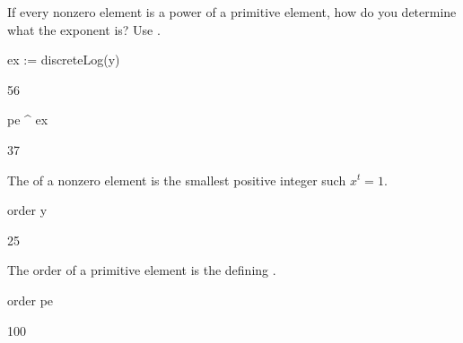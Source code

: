 {{{{{{{{{{{{{{{{\begin{xtc}
\begin{TeXOutput}
\begin{fricasmath}{15}
{%
%
}%
\end{fricasmath}
\end{TeXOutput}
\end{xtc}
%
%
\begin{xtc}
\begin{xtccomment}
If every nonzero element is a power of a primitive element, how do you
determine what the exponent is?
Use
.
\end{xtccomment}
\begin{spadsrc}
ex := discreteLog(y) 
\end{spadsrc}
\begin{TeXOutput}
\begin{fricasmath}{16}
56%
\end{fricasmath}
\end{TeXOutput}
\end{xtc}
\begin{xtc}
\begin{xtccomment}
\end{xtccomment}
\begin{spadsrc}
pe ^ ex 
\end{spadsrc}
\begin{TeXOutput}
\begin{fricasmath}{17}
37%
\end{fricasmath}
\end{TeXOutput}
\end{xtc}
%
\begin{xtc}
\begin{xtccomment}
The  of a nonzero element  is the
smallest positive integer  such
$x^t = 1$.
\end{xtccomment}
\begin{spadsrc}
order y 
\end{spadsrc}
\begin{TeXOutput}
\begin{fricasmath}{18}
25%
\end{fricasmath}
\end{TeXOutput}
\end{xtc}
\begin{xtc}
\begin{xtccomment}
The order of a primitive element is the defining .
\end{xtccomment}
\begin{spadsrc}
order pe 
\end{spadsrc}
\begin{TeXOutput}
\begin{fricasmath}{19}
100%
\end{fricasmath}
\end{TeXOutput}
\end{xtc}

}}}}}}}}}}}}}}}}
